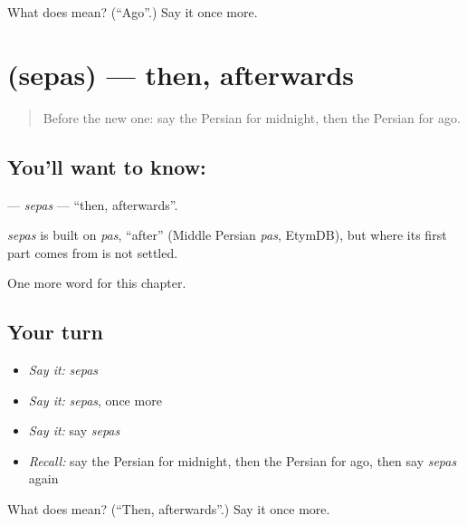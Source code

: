 \begin{tcolorbox}[breakable,colback=teal!4,colframe=teal!35!black,title={Before you move on}]
What does  mean? (\textquotedblleft{}Ago\textquotedblright{}.) Say it once more.
\end{tcolorbox}
\section[\texorpdfstring{\fa{سپس} (sepas)}{سپس (sepas)}]{ (sepas) — then, afterwards}

\label{lesson:FA-C153-sepas}



\begin{quote}
Before the new one: say the Persian for midnight, then the Persian for ago.
\end{quote}

\subsection*{You'll want to know: }
\textbf{} — \emph{sepas} — \textquotedblleft{}then, afterwards\textquotedblright{}.

\begin{cousinweb}
\emph{sepas} is built on \emph{pas}, \textquotedblleft{}after\textquotedblright{} (Middle Persian \emph{pas}, EtymDB), but where its first part comes from is not settled.
\end{cousinweb}

\begin{grammarlens}[title={What you've built}]
One more word for this chapter.
\end{grammarlens}

\subsection*{Your turn}
\begin{itemize}
\raggedright
  \item \emph{Say it:} \emph{sepas}
  \item \emph{Say it:} \emph{sepas}, once more
  \item \emph{Say it:} say \emph{sepas}
  \item \emph{Recall:} say the Persian for midnight, then the Persian for ago, then say \emph{sepas} again
\end{itemize}

\begin{tcolorbox}[breakable,colback=teal!4,colframe=teal!35!black,title={Before you move on}]
What does  mean? (\textquotedblleft{}Then, afterwards\textquotedblright{}.) Say it once more.
\end{tcolorbox}
